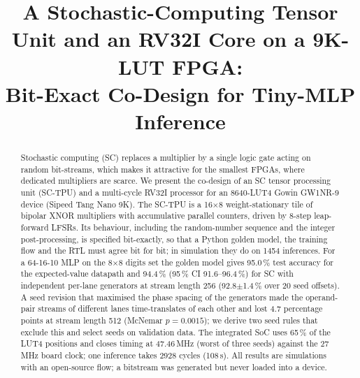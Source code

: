 \documentclass[conference]{IEEEtran}
\begin{document}
\title{A Stochastic-Computing Tensor Unit and an RV32I Core on a 9K-LUT FPGA:\\
Bit-Exact Co-Design for Tiny-MLP Inference}

\author{
}

\maketitle

\begin{abstract}
Stochastic computing (SC) replaces a multiplier by a single logic gate acting
on random bit-streams, which makes it attractive for the smallest FPGAs, where
dedicated multipliers are scarce. We present the co-design of an SC tensor
processing unit (SC-TPU) and a multi-cycle RV32I processor for an 8640-LUT4
Gowin GW1NR-9 device (Sipeed Tang Nano 9K). The SC-TPU is a 16$\times$8
weight-stationary tile of bipolar XNOR multipliers with accumulative parallel
counters, driven by 8-step leap-forward LFSRs. Its behaviour, including the
random-number sequence and the integer post-processing, is specified
bit-exactly, so that a Python golden model, the training flow and the RTL must
agree bit for bit; in simulation they do on 1454 inferences. For a 64-16-10 MLP
on the 8$\times$8 digits set the golden model gives 95.0\,\% test accuracy for
the expected-value datapath and 94.4\,\% (95\,\% CI 91.6--96.4\,\%) for SC with
independent per-lane generators at stream length 256 (92.8$\pm$1.4\,\% over 20
seed offsets). A seed revision that maximised the phase spacing of the
generators made the operand-pair streams of different lanes time-translates
of each other and lost 4.7 percentage points at stream length 512 (McNemar
$p=0.0015$); we derive two seed rules that exclude this and select seeds on
validation data. The integrated SoC uses 65\,\% of the LUT4 positions and
closes timing at 47.46\,MHz (worst of three seeds) against the 27\,MHz board
clock; one inference takes 2928 cycles (108\,\textmu s). All results are
simulations with an open-source flow; a bitstream was generated but never
loaded into a device.
\end{abstract}
\end{document}
